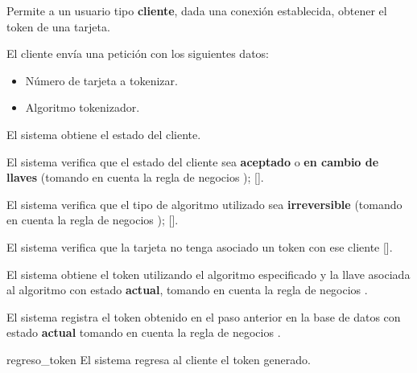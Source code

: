 %
%

{
  Permite a un usuario tipo \textbf{cliente}, dada una conexión establecida, obtener el
  token de una tarjeta.

  \begin{trayectoriaPrincipal}

    \item El cliente envía una petición con los siguientes datos:
      \begin{itemize}
        \item Número de tarjeta a tokenizar.
        \item Algoritmo tokenizador.
      \end{itemize}

    \item El sistema obtiene el estado del cliente.

    \item El sistema verifica que el estado del cliente sea \textbf{aceptado} o
      \textbf{en cambio de llaves} (tomando en cuenta la regla de negocios
      );
      [].

    \item El sistema verifica que el tipo de algoritmo utilizado sea
      \textbf{irreversible} (tomando en cuenta la regla de negocios
      );
      [].

    \item El sistema verifica que la tarjeta no tenga asociado un token con ese
      cliente [].

    \item El sistema obtiene el token utilizando el algoritmo especificado y la
      llave asociada al algoritmo con estado \textbf{actual}, tomando en cuenta
      la regla de negocios .

    \item El sistema registra el token obtenido en el paso anterior en la base
      de datos con estado \textbf{actual} tomando en cuenta la regla de negocios
      .

    \item [regreso_token] El sistema regresa al cliente el token generado.


\end{trayectoriaPrincipal}}
